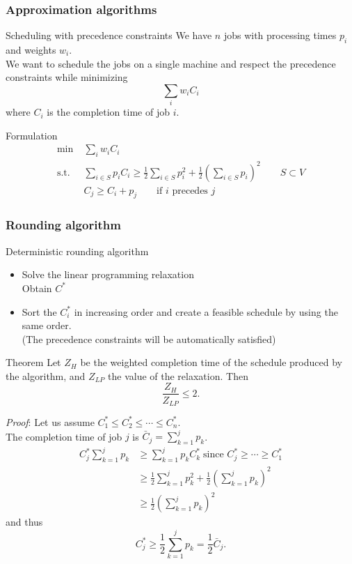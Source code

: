 \documentclass[9pt]{beamer}
\begin{document}
\begin{frame}
\frametitle{Approximation algorithms}
\begin{block}{Scheduling with precedence constraints}
We have $n$ jobs with processing times $p_i$ and weights $w_i$.\\
We want to schedule the jobs on a \alert{single machine} and
respect the \alert{precedence constraints} while minimizing
$$\sum_i w_i C_i$$
where $C_i$ is the \alert{completion time} of job $i$.
\end{block}
\begin{block}{Formulation}
\begin{align*}
\min\; & \sum_i w_i C_i\\
\text{s.t. }\;& \sum_{i\in S} p_i C_i \geq \frac{1}{2} \sum_{i\in S} p_i^2 +\frac{1}{2}
\left( \sum_{i\in S} p_i\right)^2\qquad S\subset V\\
&C_j \geq C_i + p_j \qquad \text{if } i \text{ precedes } j
\end{align*}
\end{block}
\end{frame}
\begin{frame}
\frametitle{Rounding algorithm }
\begin{block}{Deterministic rounding algorithm}
\begin{itemize}
\item<1-> \alert{Solve} the linear programming relaxation\\
Obtain $C^*$
\item<1-> \alert{Sort} the $C_i^*$ in increasing order and create 
a feasible schedule by using the \alert{same order}.\\
(The precedence constraints will be automatically satisfied)
\end{itemize}
\end{block}
\begin{block}{Theorem}
Let $Z_H$ be the weighted completion time  of the schedule produced by the
algorithm, and $Z_{LP}$ the value of the relaxation. Then
$$\frac{Z_H}{Z_{LP}}\leq 2.$$
\end{block}
\end{frame}
\begin{frame}
\textit{Proof}:
Let us assume $C^*_1 \leq C^*_2 \leq \cdots \leq C^*_n$.\\
The completion time of job $j$ is $\bar C_j=\sum_{k=1}^j p_k$.
\begin{align*}
C_j^*\sum_{k=1}^j p_k &\geq \sum_{k=1}^j p_k C_k^* \; \text{since } C_j^*\geq \cdots \geq C_1^*\\
&\geq \frac{1}{2} \sum_{k=1}^j p_k^2 + \frac{1}{2} \left( \sum_{k=1}^j p_k \right)^2\\
&\geq \frac{1}{2} \left( \sum_{k=1}^j p_k \right)^2
\end{align*}
and thus
$$C_j^* \geq \frac{1}{2} \sum_{k=1}^j p_k =\frac{1}{2} \bar C_j.$$
\end{frame}
\end{document}
